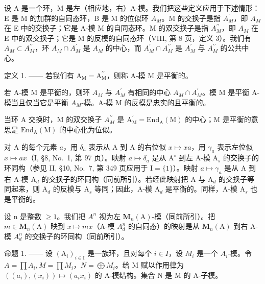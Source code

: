 设 A 是一个环，M 是左（相应地，右）A-模。我们把这些定义应用于下述情形：E 是 M 的加群的自同态环，B 是 M 的位似环 \(A_{M}\)。M 的交换子是指 \(A_{M}^{\prime}\)，即 \(A_{M}\) 在 E 中的交换子；它是 A-模 M 的自同态环。M 的双交换子是指 \(A_{M}^{\prime\prime}\)，即 \(A_{M}\) 在 E 中的双交换子；它是 M 的反模的自同态环（VIII, 第 8 页，定义 3）。我们有 \(A_{M} \subset A_{M}^{\prime\prime}\)，环 \(A_{M} \cap A_{M}^{\prime}\) 是 \(A_{M}\) 的中心，而 \(A_{M}^{\prime} \cap A_{M}^{\prime\prime}\) 是 \(A_{M}^{\prime}\) 与 \(A_{M}^{\prime\prime}\) 的公共中心。

定义 1. —— 若我们有 \(\mathrm{A}_{\mathrm{M}} = \mathrm{A}_{\mathrm{M}}^{\prime \prime}\)，则称 A-模 M 是平衡的。

若 A-模 M 是平衡的，则环 \(A_{M}\) 与 \(A_{M}^{\prime}\) 有相同的中心 \(A_{M} \cap A_{M}^{\prime}\)。模 M 是平衡 A-模当且仅当它是平衡 \(A_{M}\)-模。A-模 M 的反模是忠实的且平衡的。

当环 A 交换时，M 的双交换子 \(A_{M}^{\prime\prime}\) 是 \(\mathrm{A}_{\mathrm{M}}^{\prime}=\mathrm{End}_{\mathrm{A}}(\mathrm{M})\) 的中心；M 是平衡的意思是 \(\mathrm{End}_{\mathrm{A}}(\mathrm{M})\) 的中心化为位似。

对 A 的每个元素 \(a\)，用 \(\delta_{a}\) 表示从 A 到 A 的右位似 \(x\mapsto xa\)，用 \(\gamma_{a}\) 表示左位似 \(x\mapsto ax\)（I, §8, No.~1, 第 97 页）。映射 \(a\mapsto \delta_{a}\) 是从 \(\mathrm{A}^{\circ}\) 到左 A-模 \(\mathrm{A}_s\) 的交换子的环同构（参见 II, §10, No.~7, 第 349 页应用于 \(\mathrm{I} = \{1\}\)）。映射 \(a\mapsto \gamma_{a}\) 是从 A 到右 A-模 \(\mathrm{A}_d\) 的交换子的环同构（同前所引）。若经此映射把 A 与 \(\mathrm{A}_d\) 的交换子等同起来，则 \(\mathrm{A}_d\) 的反模与 \(\mathrm{A}_s\) 等同；因此，A-模 \(\mathrm{A}_d\) 是平衡的。同样，A-模 \(\mathrm{A}_s\) 也是平衡的。

设 n 是整数 \(\geqslant 1\)。我们把 \(A^{n}\) 视为左 \(\mathbf{M}_{n}(\mathrm{A})\)-模（同前所引）。把 \(m \in \mathbf{M}_{n}(\mathrm{A})\) 映到 \(x \mapsto mx\)（A-模 \(A_{d}^{n}\) 的自同态）的映射是从 \(\mathbf{M}_{n}(\mathrm{A})\) 到右 A-模 \(A_{d}^{n}\) 的交换子的环同构（同前所引）。

命题 1. —— 设 \((\mathrm{A}_{i})_{i\in\mathrm{I}}\) 是一族环，且对每个 \(i\in I\)，设 \(M_{i}\) 是一个 \(A_{i}\)-模。令 \(A=\prod A_{i}, M=\prod M_{i}\)，\(N=\bigoplus M_{i}\)。给 M 赋以作用律为 \(((a_{i}),(x_{i}))\mapsto(a_{i}x_{i})\) 的 A-模结构。集合 N 是 M 的 A-子模。

